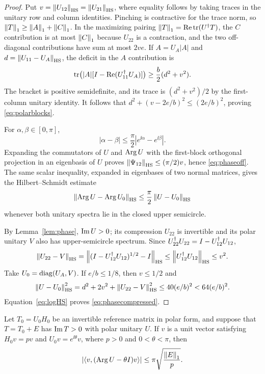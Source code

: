 \begin{proof}
Put $v=\left\lVert U_{12}\right\rVert_{\mathrm{HS}}=\left\lVert U_{21}\right\rVert_{\mathrm{HS}}$, where equality follows
by taking traces in the unitary row and column identities.
Pinching is contractive for the trace norm, so
$\left\lVert T\right\rVert_1\geq\left\lVert A\right\rVert_1+\left\lVert C\right\rVert_1$.
In the maximizing pairing $\left\lVert T\right\rVert_1=\operatorname{Re}\operatorname{tr}(U^\dagger T)$,
the $C$ contribution is at most $\left\lVert C\right\rVert_1$ because $U_{22}$ is
a contraction, and the two off-diagonal contributions have sum at most
$2ve$.
If $A=U_A|A|$ and $d=\left\lVert U_{11}-U_A\right\rVert_{\mathrm{HS}}$, the deficit in
the $A$ contribution is
\[
 \operatorname{tr}\bigl(|A|[I-\operatorname{Re}(U_{11}^\dagger U_A)]\bigr)
 \geq \frac b2(d^2+v^2).
\]
The bracket is positive semidefinite, and its trace is
$(d^2+v^2)/2$ by the first-column unitary identity.
It follows that $d^2+(v-2e/b)^2\leq(2e/b)^2$, proving
\eqref{eq:polarblocks}.

For $\alpha,\beta\in[0,\pi]$,
\begin{equation}\label{eq:chord}
 |\alpha-\beta|\leq\frac\pi2|e^{\ii\alpha}-e^{\ii\beta}|.
\end{equation}
Expanding the commutators of $U$ and $\operatorname{Arg} U$ with the first-block
orthogonal projection in an eigenbasis of $U$ proves
$\left\lVert\Psi_{12}\right\rVert_{\mathrm{HS}}\leq(\pi/2)v$, hence \eqref{eq:phaseoff}.
The same scalar inequality, expanded in eigenbases of two normal
matrices, gives the Hilbert--Schmidt estimate
\begin{equation}\label{eq:logHS}
 \left\lVert\operatorname{Arg} U-\operatorname{Arg} U_0\right\rVert_{\mathrm{HS}}
 \leq\frac\pi2\left\lVert U-U_0\right\rVert_{\mathrm{HS}}
\end{equation}
whenever both unitary spectra lie in the closed upper semicircle.

By Lemma~\ref{lem:phase}, $\operatorname{Im} U>0$; its compression $U_{22}$
is invertible and its polar unitary $V$ also has upper-semicircle
spectrum. Since
$U_{22}^\dagger U_{22}=I-U_{12}^\dagger U_{12}$,
\[
 \left\lVert U_{22}-V\right\rVert_{\mathrm{HS}}
 =\left\lVert(I-U_{12}^\dagger U_{12})^{1/2}-I\right\rVert_{\mathrm{HS}}
 \leq\left\lVert U_{12}^\dagger U_{12}\right\rVert_{\mathrm{HS}}\leq v^2 .
\]
Take $U_0=\operatorname{diag}(U_A,V)$. If $e/b\leq1/8$, then $v\leq1/2$ and
\[
 \left\lVert U-U_0\right\rVert_{\mathrm{HS}}^2=d^2+2v^2+\left\lVert U_{22}-V\right\rVert_{\mathrm{HS}}^2
 \leq40(e/b)^2<64(e/b)^2.
\]
Equation~\eqref{eq:logHS} proves \eqref{eq:phasecompressed}.
\end{proof}

\begin{lemma}\label{lem:weightedpolar}
Let $T_0=U_0H_0$ be an invertible reference matrix in polar form,
and suppose that $T=T_0+E$ has $\operatorname{Im} T>0$ with polar unitary $U$.
If $v$ is a unit vector satisfying
$H_0v=pv$ and $U_0v=e^{\ii\theta}v$, where $p>0$ and $0<\theta<\pi$,
then
\begin{equation}\label{eq:weightedphase}
 \left|\left\langle v,(\operatorname{Arg} U-\theta I)v\right\rangle\right|
 \leq\pi\sqrt{\frac{\left\lVert E\right\rVert_1}{p}} .
\end{equation}
\end{lemma}

